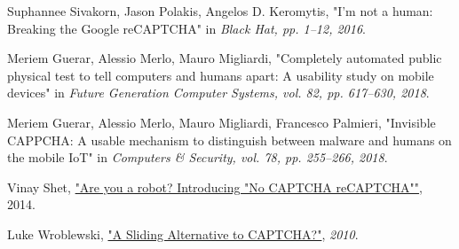 \begin{thebibliography}{9}
Suphannee Sivakorn, Jason Polakis, Angelos D. Keromytis, "I'm not a human: Breaking the Google reCAPTCHA" in \emph{Black Hat, pp. 1–12, 2016}.

Meriem Guerar, Alessio Merlo, Mauro Migliardi, "Completely automated public physical test to tell computers and humans apart: A usability study on mobile devices" in \emph{Future Generation Computer Systems, vol. 82, pp. 617–630, 2018}.

Meriem Guerar, Alessio Merlo, Mauro Migliardi, Francesco Palmieri, "Invisible CAPPCHA: A usable mechanism to distinguish between malware and humans on the mobile IoT" in \emph{Computers \& Security, vol. 78, pp. 255–266, 2018}.

Vinay Shet, \href{https://security.googleblog.com/2014/12/are-you-robot-introducing-no-captcha.html}{"Are you a robot? Introducing "No CAPTCHA reCAPTCHA""}, 2014.

Luke Wroblewski, \href{https://www.lukew.com/ff/entry.asp?1138}{"A Sliding Alternative to CAPTCHA?"}, \emph{2010}.


\end{thebibliography}